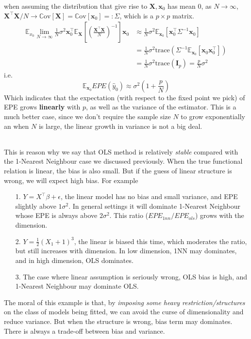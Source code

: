 \documentclass[a4paper, 11pt]{article}
\begin{document}
when assuming the distribution that give rise to $\bm{X}, \bm{x}_0$ has mean 0, as $N\to \infty$, $\bm{X}^{\top}\bm{X}/N \to \mathrm{\mathbb{C}ov}\left[\bm{X}\right] = \mathrm{\mathbb{C}ov}\left[\bm{x}_0\right] =: \Sigma$, which is a $p\times p$ matrix. 
\begin{equation}
	\begin{split}
		\mathbb{E}_{x_0}\lim\limits_{N\rightarrow\infty}\frac{1}{N}\sigma^2\bm{x}_0^{\top} \mathbb{E}_{\bm{X}}\left[\left(\frac{\bm{X}^{\top}\bm{X}}{N}\right)^{-1}\right] \bm{x}_0 & \approx \frac{1}{N}\sigma^2 \mathbb{E}_{\bm{x}_0}\left[\bm{x}_0^{\top}\Sigma^{-1}\bm{x}_0\right]  \\
		&= \frac{1}{N}\sigma^2 \text{trace}\left(\Sigma^{-1}\mathbb{E}_{\bm{x}_0}\left[\bm{x}_0\bm{x}_0^{\top}\right]\right) \\
		&= \frac{1}{N}\sigma^2 \text{trace}(\bm{I}_p) = \frac{p}{N} \sigma^2
	\end{split}
\end{equation}
i.e.
\begin{equation}
	\mathbb{E}_{\bm{x}_0} EPE(\hat{y}_0) \approx \sigma^2 \left(1+\frac{p}{N}\right)
\end{equation}
Which indicates that the expectation (with respect to the fixed point we pick) of EPE grows \textbf{linearly} with $p$, as well as the variance of the estimator. This is a much better case, since we don't require the sample size $N$ to grow exponentially an when $N$ is large, the linear growth in variance is not a big deal. 

~\\
This is reason why we say that OLS method is relatively \emph{stable} compared with the 1-Nearest Neighbour case we discussed previously. When the true functional relation is linear, the bias is also small. But if the guess of linear structure is wrong, we will expect high bias. For example
\begin{itemize}
	\item[1.] $Y=X^{\top}\beta + \epsilon$, the linear model has no bias and small variance, and EPE slightly above $1\sigma^2$. In general settings it will dominate 1-Nearest Neighbour whose EPE is always above $2\sigma^2$. This ratio ($EPE_{1nn}/EPE_{ols}$) grows with the dimension.
	\item[2.] $Y=\frac{1}{2}(X_1+1)^3$, the linear is biased this time, which moderates the ratio, but still increases with dimension. In low dimension, 1NN may dominates, and in high dimension, OLS dominates.
	\item[3.] The case where linear assumption is seriously wrong, OLS bias is high, and 1-Nearest Neighbour may dominate OLS.
\end{itemize}
The moral of this example is that, by \emph{imposing some heavy restriction/structures} on the class of models being fitted, we can avoid the curse of dimensionality and reduce variance. But when the structure is wrong, bias term may dominates. There is always a trade-off between bias and variance.
\end{document}
